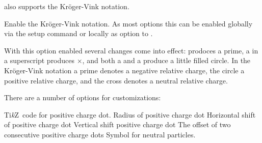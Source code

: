 \documentclass[load-preamble+]{cnltx-doc}
\newcommand*\TikZ{Ti\textit{k}Z}
\begin{document}
\chemformula{} also supports the Kröger-Vink notation.
\begin{options}
    Enable the Kröger-Vink notation. As most options this can be enabled
    globally via the setup command or locally as option to .
\end{options}

With this option enabled several changes come into effect:  prodoces a
prime, a  in a superscript produces $\times$, and both a  and
a \code{*} produce a little filled circle. In the Kröger-Vink notation a prime
denotes a negative relative charge, the circle a positive relative charge, and
the cross denotes a neutral relative charge.

\begin{example}[side-by-side,add-sourcecode-options={literate=}]
  \par
  \par
  \par
  \par
  \par
  \par
\end{example}

There are a number of options for customizations:
\begin{options}
  \keyval{kv-positive-style}{\TikZ}\Default
    \TikZ\ code for positive charge dot.
  \Default{.3ex}
    Radius of positive charge dot
  \Default{.15em}
    Horizontal shift of positive charge dot
  \Default{.5ex}
    Vertical shift positive charge dot
  \Default{.4em}
    The offset of two consecutive positive charge dots
    Symbol for neutral particles.
\end{options}
\end{document}
